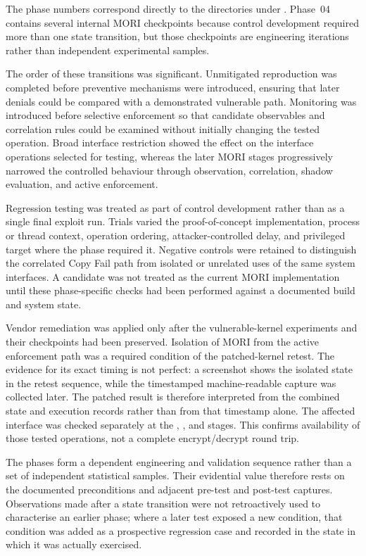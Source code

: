 The phase numbers correspond directly to the directories under
. Phase~04 contains several internal MORI checkpoints because
control development required more than one state transition, but those
checkpoints are engineering iterations rather than independent experimental
samples.

The order of these transitions was significant. Unmitigated reproduction was
completed before preventive mechanisms were introduced, ensuring that later
denials could be compared with a demonstrated vulnerable path. Monitoring was
introduced before selective enforcement so that candidate observables and
correlation rules could be examined without initially changing the tested
operation. Broad interface restriction showed the effect on the interface
operations selected for testing, whereas the later MORI stages progressively
narrowed the controlled behaviour through observation, correlation, shadow
evaluation, and active enforcement.

Regression testing was treated as part of control development rather than as a
single final exploit run. Trials varied the proof-of-concept implementation,
process or thread context, operation ordering, attacker-controlled delay, and
privileged target where the phase required it. Negative controls were retained
to distinguish the correlated Copy Fail path from isolated or unrelated uses of
the same system interfaces. A candidate was not treated as the current MORI
implementation until these phase-specific checks had been performed against a
documented build and system state.

Vendor remediation was applied only after the vulnerable-kernel experiments
and their checkpoints had been preserved. Isolation of MORI from the active
enforcement path was a required condition of the patched-kernel retest. The
evidence for its exact timing is not perfect: a screenshot shows the isolated
state in the retest sequence, while the timestamped machine-readable capture
was collected later. The patched result is therefore interpreted from the
combined state and execution records rather than from that timestamp alone.
The affected interface was checked separately at the ,
, and  stages. This confirms availability of those
tested operations, not a complete encrypt/decrypt round trip.

The phases form a dependent engineering and validation sequence rather than a
set of independent statistical samples. Their evidential value therefore rests
on the documented preconditions and adjacent pre-test and post-test captures.
Observations made after a state transition were not retroactively used to
characterise an earlier phase; where a later test exposed a new condition, that
condition was added as a prospective regression case and recorded in the state
in which it was actually exercised.

